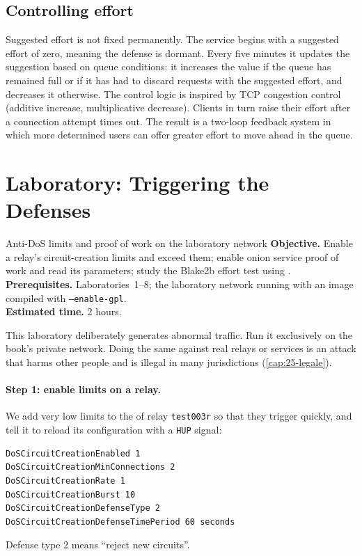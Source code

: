 \subsection{Controlling effort}

Suggested effort is not fixed permanently. The service begins with a suggested effort of zero, meaning the defense is dormant. Every five minutes it updates the suggestion based on queue conditions: it increases the value if the queue has remained full or if it has had to discard requests with the suggested effort, and decreases it otherwise. The control logic is inspired by TCP congestion control (additive increase, multiplicative decrease). Clients in turn raise their effort after a connection attempt times out. The result is a two-loop feedback system in which more determined users can offer greater effort to move ahead in the queue.

\section{Laboratory: Triggering the Defenses}\label{sec:lab-dos}

\begin{laboratorio}[9]{Anti-DoS limits and proof of work on the laboratory network}
\textbf{Objective.} Enable a relay's circuit-creation limits and exceed them; enable onion service proof of work and read its parameters; study the Blake2b effort test using .\\
\textbf{Prerequisites.} Laboratories~1--8; the laboratory network running with an image compiled with \texttt{--enable-gpl}.\\
\textbf{Estimated time.} 2 hours.
\end{laboratorio}

\begin{attenzione}
This laboratory deliberately generates abnormal traffic. Run it exclusively on the book's private network. Doing the same against real relays or services is an attack that harms other people and is illegal in many jurisdictions (\cref{cap:25-legale}).
\end{attenzione}

\paragraph{Step 1: enable limits on a relay.} We add very low limits to the  of relay \texttt{test003r} so that they trigger quickly, and tell it to reload its configuration with a \texttt{HUP} signal:
\begin{lstlisting}[language=torrc,numbers=none]
DoSCircuitCreationEnabled 1
DoSCircuitCreationMinConnections 2
DoSCircuitCreationRate 1
DoSCircuitCreationBurst 10
DoSCircuitCreationDefenseType 2
DoSCircuitCreationDefenseTimePeriod 60 seconds
\end{lstlisting}
Defense type 2 means \enquote{reject new circuits}.

